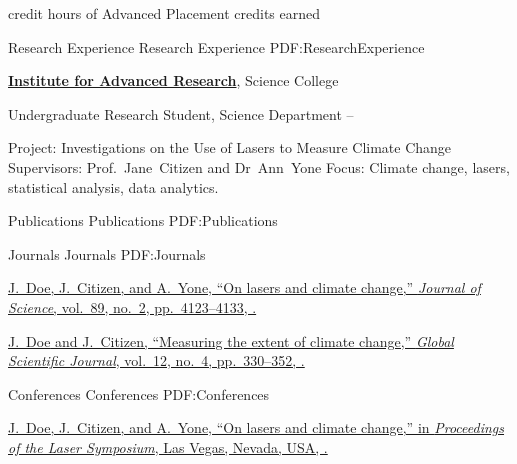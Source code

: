 \documentclass[letterpaper,MMMyyyy,nonstopmode]{simpleresumecv}
\begin{document}
\begin{Body}
\begin{Detail}
     credit hours of Advanced Placement credits earned
    \end{Detail}
\fi
\iffalse
	\Section
	{Research Experience}
	{Research Experience}
	{PDF:ResearchExperience}
	
	\Entry
	\href{http://www.example.com/my-institute}
	{\textbf{Institute for Advanced Research}},
	Science College

	\Gap
	\BulletItem
	Undergraduate Research Student, Science Department
	\hfill
	 --
	\begin{Detail}
	\SubBulletItem
	Project:
	Investigations on the Use of Lasers to Measure Climate Change
	\SubBulletItem
	Supervisors:
	Prof.~Jane~Citizen and
	Dr~Ann~Yone
	\SubBulletItem
	Focus:
	Climate change, lasers, statistical analysis, data analytics.
	\end{Detail}
	
	
	\Section
	{Publications}
	{Publications}
	{PDF:Publications}
		
	\SubSection
	{Journals}
	{Journals}
	{PDF:Journals}
	
	\begingroup
	\renewcommand{\MaxNumberedItem}{[88]}
	
	\Gap
	\NumberedItem{[10]}
	\href{http://www.example.com/my-paper-doi-5}
	{\underline{J.~Doe}, J.~Citizen, and A.~Yone,
	``On lasers and climate change,''
	\textit{Journal of Science},
	vol.~89,
	no.~2,
	pp.~4123--4133,
	.}
	
	\Gap
	\NumberedItem{[1]}
	\href{http://www.example.com/my-paper-doi-4}
	{\underline{J.~Doe} and J.~Citizen,
	``Measuring the extent of climate change,''
	\textit{Global Scientific Journal},
	vol.~12,
	no.~4,
	pp.~330--352,
	.}

	\endgroup
	
	\BigGap
	\SubSection
	{Conferences}
	{Conferences}
	{PDF:Conferences}

	\begingroup
	\renewcommand{\MaxNumberedItem}{[8888]}
	
	\Gap
	\NumberedItem{[1000]}
	\href{http://www.example.com/my-paper-doi-3}
	{\underline{J.~Doe}, J.~Citizen, and A.~Yone,
	``On lasers and climate change,''
	in \textit{Proceedings of the Laser Symposium},
	Las Vegas, Nevada, USA,
	.}
	

\end{Body}
\end{document}
